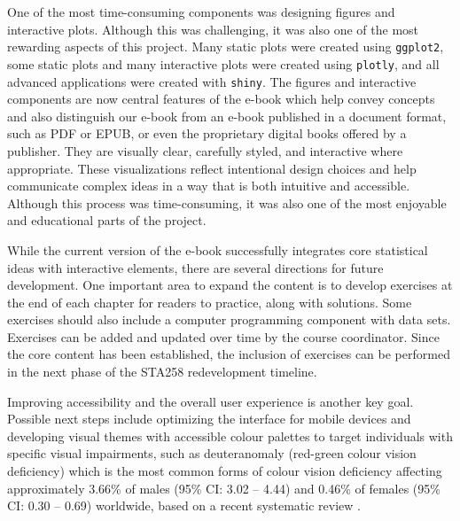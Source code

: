 \documentclass[11pt]{article}
\begin{document}
One of the most time-consuming components was designing figures and interactive plots. 
Although this was challenging, it was also one of the most rewarding aspects of this project.
Many static plots were created using \texttt{ggplot2}, some static plots and many interactive plots were created using \texttt{plotly}, 
and all advanced applications were created with \texttt{shiny}. 
The figures and interactive components are now central features of the e-book which help convey concepts and also distinguish our e-book from an e-book published in a document format, such as PDF or EPUB, or even the proprietary digital books offered by a publisher.
They are visually clear, carefully styled, and interactive where appropriate. These visualizations reflect intentional design choices and help communicate complex ideas in a way that is both intuitive and accessible. Although this process was time-consuming, it was also one of the most enjoyable and educational parts of the project.


While the current version of the e-book successfully integrates core statistical ideas with interactive elements, there are several directions for future development. 
One important area to expand the content is to develop exercises at the end of each chapter for readers to practice, along with solutions.
Some exercises should also include a computer programming component with data sets.
Exercises can be added and updated over time by the course coordinator.
Since the core content has been established, the inclusion of exercises can be performed in the next phase of the STA258 redevelopment timeline.


Improving accessibility and the overall user experience is another key goal. 
Possible next steps include optimizing the interface for mobile devices and developing visual themes with accessible colour palettes to target individuals with specific visual impairments, such as deuteranomaly (red-green colour vision deficiency) which is the most common forms of colour vision deficiency affecting approximately 3.66\% of males (95\% CI: 3.02 -- 4.44) and 0.46\% of females (95\% CI: 0.30 -- 0.69) worldwide, based on a recent systematic review \cite{Jeong2025}.
\end{document}
